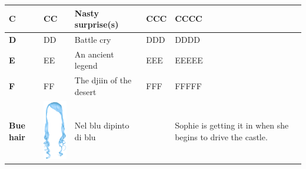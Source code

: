 \begin{longtable}[H]{|p{2cm}|p{1.5cm}|p{2cm}|p{2.8cm}|p{6.3cm}|}
\textbf{C}                           & CC                                                            & Nasty surprise(s)                                                                  & CCC                                                                                  & CCCC                                                                                                                                  \\ \hline
\textbf{D}                           & DD                                                            & Battle cry                                                                         & DDD                                                                                  & DDDD                                                                                                                                  \\ \hline
\textbf{E}                           & EE                                                            & An ancient legend                                                                  & EEE                                                                                  & EEEEE                                                                                                                                 \\ \hline
\textbf{F}                           & FF                                                            & The djiin of the desert                                                            & FFF                                                                                  & FFFFF                                                                                                                                 \\ \hline
\textbf{Bue hair}                    & \includegraphics[width=1.4cm]{Images/Hats/blueHair}           & Nel blu dipinto di blu                                                             &                                                                                      & Sophie is getting it in when she begins to drive the castle.                                                                          \\ \hline

\end{longtable}
